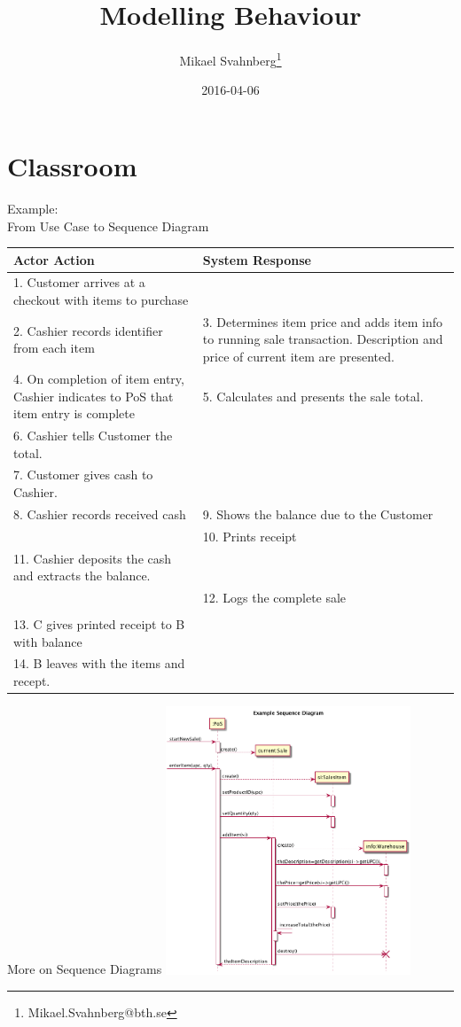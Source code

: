 \documentclass[10pt,t,a4paper]{beamer}
\author{Mikael Svahnberg\thanks{Mikael.Svahnberg@bth.se}}
\date{2016-04-06}
\title{Modelling Behaviour}
\begin{document}
\maketitle

\section{Classroom}
\label{sec-1}
\begin{frame}[shrink=25,label=sec-1-1]{Example: \\ From Use Case to Sequence Diagram}
\begin{center}
\begin{tabular}{p{7cm}p{7cm}}
Actor Action & System Response\\
\hline
1. Customer arrives at a checkout with items to purchase & \\
2. Cashier records identifier from each item & 3. Determines item price and adds item info to running sale transaction. Description and price of current item are presented.\\
4. On completion of item entry, Cashier indicates to PoS that item entry is complete & 5. Calculates and presents the sale total.\\
6. Cashier tells Customer the total. & \\
7. Customer gives cash to Cashier. & \\
8. Cashier records received cash & 9. Shows the balance due to the Customer\\
 & 10. Prints receipt\\
11. Cashier deposits the cash and extracts the balance. & \\
 & 12. Logs the complete sale\\
 & \\
13. C gives printed receipt to B with balance & \\
14. B leaves with the items and recept. & \\
\hline
\end{tabular}
\end{center}
\end{frame}
\begin{frame}[label=sec-1-2]{More on Sequence Diagrams}
\vspace{-1cm}\hspace{2cm}
\includegraphics[height=8cm]{FSequenceDiagrams.png}
\end{frame}
\end{document}
